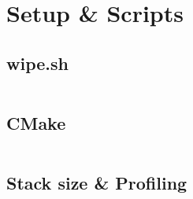 \section{Setup \& Scripts}

\subsection{wipe.sh}

\inputminted{bash}{\code/wipe.sh}

\subsection{CMake}

\inputminted{text}{\code/CMakeLists.txt}

\subsection{Stack size \& Profiling}

\inputminted{bash}{\code/stack.sh}
